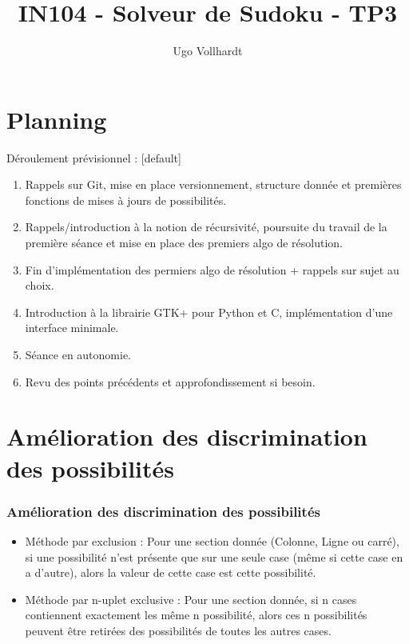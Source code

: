 \documentclass{beamer}
\title{IN104 - Solveur de Sudoku - TP3}
\author{Ugo Vollhardt}
\institute{CEA LIST}
\begin{document}
	\maketitle
	\section{Planning}
\begin{frame}
	Déroulement prévisionnel : 
	[default]
	\begin{enumerate}
		\item Rappels sur Git, mise en place versionnement, structure donnée et premières fonctions de mises à jours de possibilités.
		\item Rappels/introduction à la notion de récursivité, poursuite du travail de la première séance et mise en place des premiers algo de résolution.
		\item Fin d'implémentation des permiers algo de résolution + rappels sur sujet au choix.
		\item Introduction à la librairie GTK+ pour Python et C, implémentation d'une interface minimale.
		\item Séance en autonomie.
		\item Revu des points précédents et approfondissement si besoin.
	\end{enumerate}
	\end{frame}
	
	\section{Amélioration des discrimination des possibilités}
	\begin{frame}
	\frametitle{Amélioration des discrimination des possibilités}
		\begin{itemize}
			\item Méthode par exclusion : Pour une section donnée (Colonne, Ligne ou carré), si une possibilité n'est présente que sur une seule case (même si cette case en a d'autre), alors la valeur de cette case est cette possibilité.
			\item Méthode par n-uplet exclusive :  Pour une section donnée, si n cases contiennent exactement les même n possibilité, alors ces n possibilités peuvent être retirées des possibilités de toutes les autres cases.
			
		\end{itemize}
	\end{frame}
\end{document}
